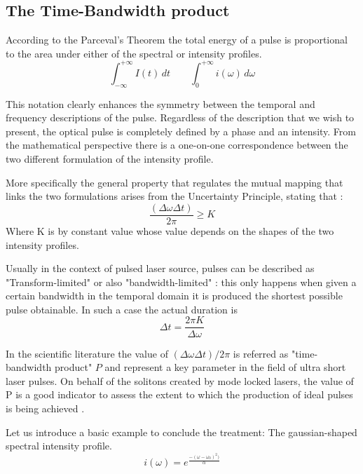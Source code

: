 \subsection{The Time-Bandwidth product}
According to the Parceval's Theorem the total energy of a pulse is proportional to the area under either of the spectral or intensity profiles.
\begin{equation}
    \int_{-\infty}^{+\infty} I(t)\, dt \quad \quad  \int_{0}^{+\infty} i(\omega)\, d\omega
\label{eq:AreaIntensities}
\end{equation}

This notation clearly enhances the symmetry between the temporal and frequency descriptions of the pulse.
Regardless of the description that we wish to present, the optical pulse is completely defined by a phase and an intensity. From the mathematical perspective there is a one-on-one correspondence between the two different formulation of the intensity profile.

More specifically the general property that regulates the mutual mapping that links the two formulations arises from the Uncertainty Principle, stating that : 
\begin{equation}
    \frac{(\Delta \omega \Delta t)}{2\pi} \ge K
\label{eq:Uncertainty}
\end{equation}
Where K is by constant value whose value depends on the shapes of the two intensity profiles.

Usually in the context of pulsed laser source, pulses can be described as "Transform-limited" or also "bandwidth-limited" : this only happens when given a certain bandwidth in the temporal domain it is produced the shortest possible pulse obtainable.
In such a case the actual duration is 
\begin{equation}
    \Delta t = \frac{2\pi K}{\Delta \omega}
\label{eq:TransLimited}
\end{equation}

In the scientific literature the value of $(\Delta \omega \Delta t)/2\pi$ is referred as "time-bandwidth product" $P$ and represent a key parameter in the field of ultra short laser pulses. On behalf of the solitons created by mode locked lasers, the value of P is a good indicator to assess the extent to which the production of ideal pulses is being achieved \cite{shapiro1984}.

Let us introduce a basic example to conclude the treatment: The gaussian-shaped spectral intensity profile.
\begin{equation}
    i(\omega) = e^{\frac{-(\omega - \omega _0 )^2)}{\alpha}}
\label{eq:exampleSpectral}
\end{equation}

